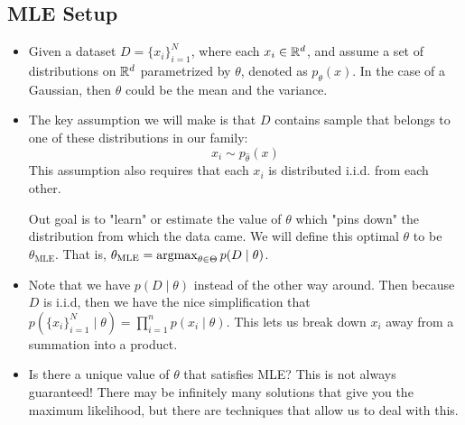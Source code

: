 \subsection{MLE Setup}
\begin{itemize}
	\item Given a dataset \( D = \{x_i\}_{i = 1}^{N} \), where each \( x_i \in \mathbb R^{d}
		\), and assume a set of distributions on \( \mathbb R^{d} \) parametrized by \(
		\theta \), denoted as \( p_{\theta}(x) \). In the case of a Gaussian, then \(
		\theta\) could be the mean and the variance. 
	\item The key assumption we will make is that \( D \) contains sample that
		belongs to one of these distributions in our family: 
		\[
			x_i \sim p_{\hat{\theta}}(x)
		\]
		This assumption also requires that each \( x_i \) is distributed i.i.d. from
		each other. 

		Out goal is to "learn" or estimate the value of \( \theta \) which "pins
		down" the distribution from which the data came. We will define this optimal
		\( \theta \) to be \( \theta_\text{MLE} \). That is, \( \theta_\text{MLE} =
		\operatorname*{argmax}_{\theta \in \Theta}p(D \mid \theta) \).   
	\item Note that we have \( p(D \mid \theta) \) instead of the other way around.
		Then because \( D \) is i.i.d, then we have the nice simplification 
		that \( p(\{x_i\}_{i = 1}^{N} \mid \theta) = \prod_{i = 1}^{n} p(x_i \mid
		\theta) \). This lets us break down \( x_i \) away from a summation into a
		product. 
	\item Is there a unique value of \( \theta \) that satisfies MLE? This is not
		always guaranteed! There may be infinitely many solutions that give you the
		maximum likelihood, but there are techniques that allow us to deal with this. 
\end{itemize}
